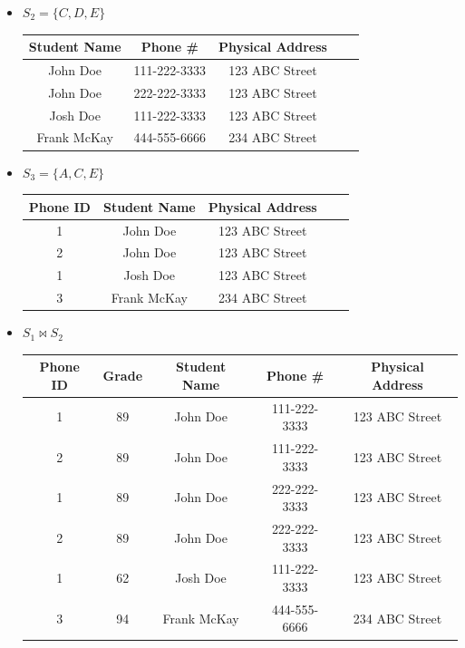 \documentclass[12pt]{article}
\begin{document}
\begin{enumerate}[1.]
\begin{enumerate}[a)]
\begin{itemize}
            \item $S_2 = \{C,D,E\}$

            \bigskip

            \begin{tabular}{|c|c|c|c|c|}
                \hline
                Student Name & Phone \# & Physical Address\\
                \hline
                John Doe & 111-222-3333 & 123 ABC Street\\
                \hline
                John Doe & 222-222-3333 & 123 ABC Street\\
                \hline
                Josh Doe & 111-222-3333 & 123 ABC Street\\
                \hline
                Frank McKay & 444-555-6666 & 234 ABC Street\\
                \hline
            \end{tabular}

            \item $S_3 = \{A,C,E\}$

            \bigskip

            \begin{tabular}{|c|c|c|c|c|}
                \hline
                Phone ID & Student Name & Physical Address\\
                \hline
                1 & John Doe & 123 ABC Street\\
                \hline
                2 & John Doe & 123 ABC Street\\
                \hline
                1 & Josh Doe & 123 ABC Street\\
                \hline
                3 & Frank McKay & 234 ABC Street\\
                \hline
            \end{tabular}

            \item $S_1 \bowtie S_2$

            \begin{tabular}{|c|c|c|c|c|}
                \hline
                Phone ID & Grade & Student Name & Phone \# & Physical Address\\
                \hline
                1 & 89 & John Doe & 111-222-3333 & 123 ABC Street\\
                \hline
                2 & 89 & John Doe & 111-222-3333 & 123 ABC Street\\
                \hline
                1 & 89 & John Doe & 222-222-3333 & 123 ABC Street\\
                \hline
                2 & 89 & John Doe & 222-222-3333 & 123 ABC Street\\
                \hline
                1 & 62 & Josh Doe & 111-222-3333 & 123 ABC Street\\
                \hline
                3 & 94 & Frank McKay & 444-555-6666 & 234 ABC Street\\
                \hline
            \end{tabular}


\end{itemize}
\end{enumerate}
\end{enumerate}
\end{document}

